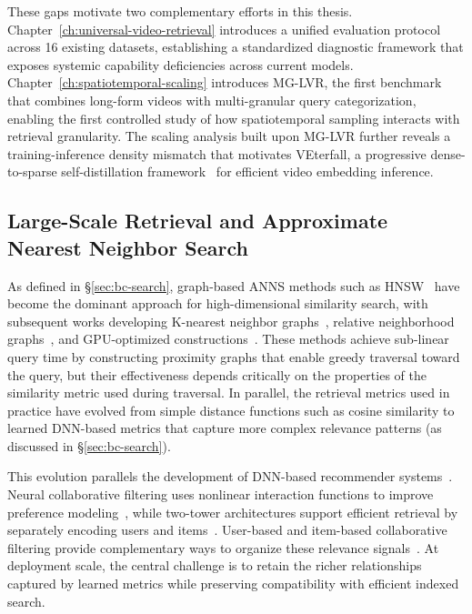 These gaps motivate two complementary efforts in this thesis. Chapter~\ref{ch:universal-video-retrieval} introduces a unified evaluation protocol across 16 existing datasets, establishing a standardized diagnostic framework that exposes systemic capability deficiencies across current models. Chapter~\ref{ch:spatiotemporal-scaling} introduces MG-LVR, the first benchmark that combines long-form videos with multi-granular query categorization, enabling the first controlled study of how spatiotemporal sampling interacts with retrieval granularity. The scaling analysis built upon MG-LVR further reveals a training-inference density mismatch that motivates VEterfall, a progressive dense-to-sparse self-distillation framework~\citep{hinton2015distilling} for efficient video embedding inference.

\subsection{Large-Scale Retrieval and Approximate Nearest Neighbor Search}
\label{sec:lr-search}

As defined in \S\ref{sec:bc-search}, graph-based ANNS methods such as HNSW~\citep{malkov2018efficient} have become the dominant approach for high-dimensional similarity search, with subsequent works developing K-nearest neighbor graphs~\citep{fu2016efanna}, relative neighborhood graphs~\citep{jayaram2019diskann}, and GPU-optimized constructions~\citep{ootomo2024cagra}. These methods achieve sub-linear query time by constructing proximity graphs that enable greedy traversal toward the query, but their effectiveness depends critically on the properties of the similarity metric used during traversal. In parallel, the retrieval metrics used in practice have evolved from simple distance functions such as cosine similarity to learned DNN-based metrics that capture more complex relevance patterns (as discussed in \S\ref{sec:bc-search}).

This evolution parallels the development of DNN-based recommender systems~\citep{zhang2019deep}. Neural collaborative filtering uses nonlinear interaction functions to improve preference modeling~\citep{he2017neural}, while two-tower architectures support efficient retrieval by separately encoding users and items~\citep{yang2020mixed}. User-based and item-based collaborative filtering provide complementary ways to organize these relevance signals~\citep{ko2022survey,zhang2020alleviating,xue2019deep}. At deployment scale, the central challenge is to retain the richer relationships captured by learned metrics while preserving compatibility with efficient indexed search.

